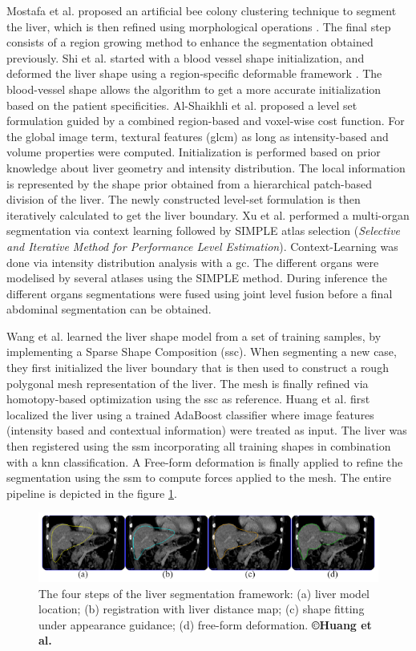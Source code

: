 Mostafa et al.\cite{Mostafa2015} proposed an artificial bee colony clustering technique to
segment the liver, which is then refined using morphological operations .
The final step consists of a region growing method to enhance the
segmentation obtained previously.
Shi et al. started with a blood vessel shape initialization, and deformed
the liver shape using a region-specific deformable framework \cite{Shi2016}. The
blood-vessel shape allows the algorithm to get a more accurate
initialization based on the patient specificities. Al-Shaikhli et al. \cite{Al-Shaikhli2015} proposed a level set formulation guided by a combined region-based and
voxel-wise cost function. For the global image term, textural features
(\ac{glcm}) as long as intensity-based and volume properties were computed.
Initialization is performed based on prior knowledge about liver
geometry and intensity distribution. The local information is
represented by the shape prior obtained from a hierarchical patch-based
division of the liver. The newly constructed level-set formulation is
then iteratively calculated to get the liver boundary.
Xu et al. \cite{Xu2015} performed a multi-organ segmentation via context learning
followed by SIMPLE atlas selection (\emph{Selective and Iterative Method
	for Performance Level Estimation}). Context-Learning was done via
intensity distribution analysis with a \ac{gc}. The different organs were modelised by several atlases using
the SIMPLE method. During inference the different organs segmentations
were fused using joint level fusion before a final abdominal
segmentation can be obtained.

Wang et al. \cite{Wang2015b} learned the liver shape model from a set of training
samples, by implementing a Sparse Shape Composition (\ac{ssc}). When
segmenting a new case, they first initialized the liver boundary that is
then used to construct a rough polygonal mesh representation of the
liver. The mesh is finally refined via homotopy-based optimization using
the \ac{ssc} as reference.
Huang et al. \cite{Huang2014} first localized the liver using a trained AdaBoost
classifier where image features (intensity based and contextual
information) were treated as input. The liver was then registered using
the \ac{ssm} incorporating all training shapes in combination with a \ac{knn}
classification. A Free-form deformation is finally applied to refine the
segmentation using the \ac{ssm} to compute forces applied to the mesh. The
entire pipeline is depicted in the figure \ref{Huang2014_Fig1}.


\begin{figure}[th!]
	\centering
	\includegraphics[width=0.7\linewidth]{images/Huang2014_Fig4_v2}
	\caption{The four steps of the liver segmentation framework: (a) liver model location; (b) registration with liver distance map; (c) shape fitting under appearance guidance; (d) free-form deformation. \textbf{©Huang et al. \cite{Huang2014}}}
	\label{Huang2014_Fig1}
\end{figure}


